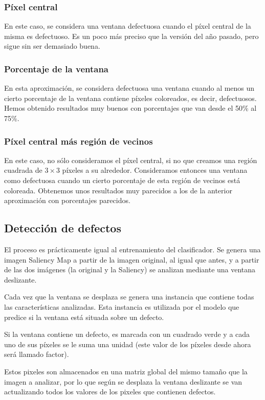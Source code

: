 \subsubsection*{Píxel central}
En este caso, se considera una ventana defectuosa cuando el píxel central de la misma es defectuoso. Es un poco más preciso que la versión del año pasado, pero sigue sin ser demasiado buena.

\subsubsection*{Porcentaje de la ventana}
En esta aproximación, se considera defectuosa una ventana cuando al menos un cierto porcentaje de la ventana contiene píxeles coloreados, es decir, defectuosos. Hemos obtenido resultados muy buenos con porcentajes que van desde el 50\% al 75\%.

\subsubsection*{Píxel central más región de vecinos}
En este caso, no sólo consideramos el píxel central, si no que creamos una región cuadrada de $3 \times 3$ píxeles a su alrededor. Consideramos entonces una ventana como defectuosa cuando un cierto porcentaje de esta región de vecinos está coloreada. Obtenemos unos resultados muy parecidos a los de la anterior aproximación con porcentajes parecidos.


\subsection{Detección de defectos}
El proceso es prácticamente igual al entrenamiento del clasificador. Se genera una imagen Saliency Map a partir de la imagen original, al igual que antes, y a partir de las dos imágenes (la original y la Saliency) se analizan mediante una ventana deslizante.

Cada vez que la ventana se desplaza se genera una instancia que contiene todas las características analizadas. Esta instancia es utilizada por el modelo que predice si la ventana está situada sobre un defecto.

Si la ventana contiene un defecto, es marcada con un cuadrado verde y a cada uno de sus píxeles se le suma una unidad (este valor de los píxeles desde ahora será llamado factor).

Estos pixeles son almacenados en una matriz global del mismo tamaño que la imagen a analizar, por lo que según se desplaza la ventana deslizante se van actualizando todos los valores de los pixeles que contienen defectos.

